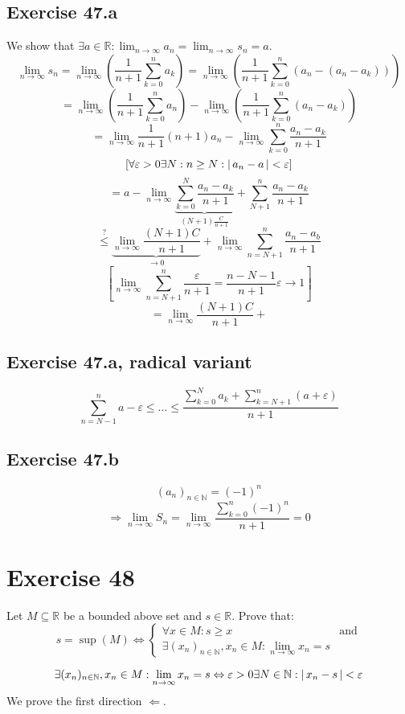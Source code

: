 \documentclass[a4paper]{article}
\theoremstyle{definition}
\newcommand\abs[1]{\left|\thinspace #1\thinspace\right|}
\begin{document}
\subsection{Exercise 47.a}
%
We show that $\exists a \in \mathbb R: \lim_{n\to\infty} a_n = \lim_{n\to\infty} s_n = a$.
%
\[
  \lim_{n\to\infty} s_n
  = \lim_{n\to\infty} \left(\frac{1}{n+1} \sum_{k=0}^n a_k\right)
  = \lim_{n\to\infty} \left(\frac1{n+1} \sum_{k=0}^n \left(a_n - (a_n - a_k)\right)\right)
\] \[
  = \lim_{n\to\infty} \left(\frac{1}{n+1} \sum_{k=0}^n a_n\right)
  - \lim_{n\to\infty} \left(\frac{1}{n+1} \sum_{k=0}^n (a_n - a_k)\right)
\] \[
  = \lim_{n\to\infty} \frac{1}{n+1} (n+1) a_n
  - \lim_{n\to\infty} \sum_{k=0}^n \frac{a_n - a_k}{n+1}
\] \[
  \left[\forall \varepsilon > 0 \exists N: n \geq N: \abs{a_n - a} < \varepsilon\right]
\] \[
  = a - \lim_{n\to\infty} \underbrace{\sum_{k=0}^{N} \frac{a_n - a_k}{n+1}}_{(N + 1) \frac{C}{n+1}} + \sum_{N+1}^n \frac{a_n - a_k}{n+1}
\] \[
  \stackrel{?}{\leq} \underbrace{\lim_{n\to\infty} \frac{(N + 1) C}{n+1}}_{\to 0}
  + \lim_{n\to\infty} \sum_{n=N+1}^n \frac{a_n - a_b}{n+1}
\] \[
  \left[\lim_{n\to\infty} \sum_{n=N+1}^n \frac{\varepsilon}{n+1} = \frac{n - N - 1}{n+1} \varepsilon \to 1\right]
\] \[
  = \lim_{n\to\infty} \frac{(N + 1) C}{n+1} +
\]

\subsection{Exercise 47.a, radical variant}
\[
  \sum_{n=N-1}^n a-\varepsilon \leq \dots \leq \frac{\sum_{k=0}^N a_k + \sum_{k=N+1}^n (a + \varepsilon)}{n+1}
\]

\subsection{Exercise 47.b}
\[ (a_n)_{n \in \mathbb N} = (-1)^n \]
\[ \Rightarrow \lim_{n\to\infty} S_n = \lim_{n\to\infty} \frac{\sum_{k=0}^n (-1)^n}{n+1} = 0 \]

\section{Exercise 48}
\begin{ex}
  Let $M \subseteq \mathbb R$ be a bounded above set and $s \in \mathbb R$.
  Prove that:
  \[
      s = \sup(M) \Leftrightarrow
      \left\{\begin{array}{ll}
        \forall x \in M: s \geq x & \text{and} \\
        \exists (x_n)_{n \in \mathbb N}, x_n \in M: \lim_{n\to\infty} x_n = s &
      \end{array}\right.
  \]
\end{ex}
\[
  \exists (x_n)_{n \in \mathbb N}, x_n \in M: \lim_{n\to\infty} x_n = s
  \Leftrightarrow \varepsilon > 0 \exists N \in \mathbb N: \abs{x_n - s} < \varepsilon
\]
We prove the first direction $\Leftarrow$.
\end{document}
